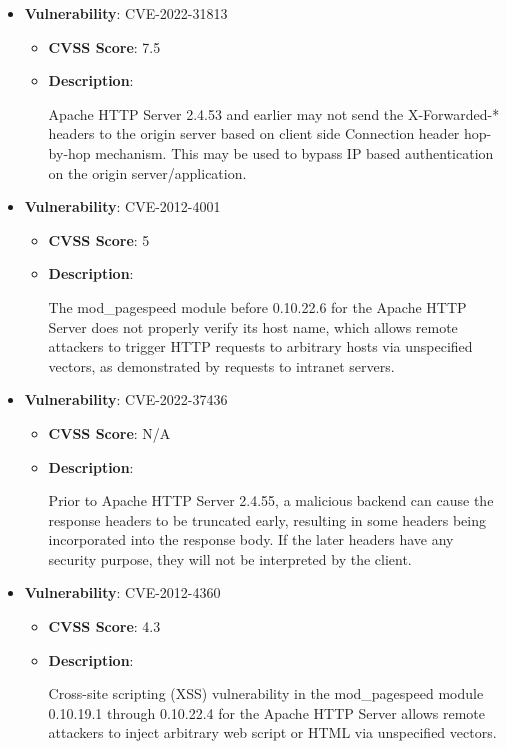 \documentclass{article}
\begin{document}
\begin{itemize}
        \item \textbf{Vulnerability}: CVE-2022-31813
        \begin{itemize}
            \item \textbf{CVSS Score}:  7.5 
            \item \textbf{Description}:
            \parbox[t]{0.9\linewidth}{
                \ttfamily Apache HTTP Server 2.4.53 and earlier may not send the X-Forwarded-* headers to the origin server based on client side Connection header hop-by-hop mechanism. This may be used to bypass IP based authentication on the origin server/application.
            }
        \end{itemize}
    
        \item \textbf{Vulnerability}: CVE-2012-4001
        \begin{itemize}
            \item \textbf{CVSS Score}:  5 
            \item \textbf{Description}:
            \parbox[t]{0.9\linewidth}{
                \ttfamily The mod\_pagespeed module before 0.10.22.6 for the Apache HTTP Server does not properly verify its host name, which allows remote attackers to trigger HTTP requests to arbitrary hosts via unspecified vectors, as demonstrated by requests to intranet servers.
            }
        \end{itemize}
    
        \item \textbf{Vulnerability}: CVE-2022-37436
        \begin{itemize}
            \item \textbf{CVSS Score}:  N/A 
            \item \textbf{Description}:
            \parbox[t]{0.9\linewidth}{
                \ttfamily Prior to Apache HTTP Server 2.4.55, a malicious backend can cause the response headers to be truncated early, resulting in some headers being incorporated into the response body. If the later headers have any security purpose, they will not be interpreted by the client.
            }
        \end{itemize}
    
        \item \textbf{Vulnerability}: CVE-2012-4360
        \begin{itemize}
            \item \textbf{CVSS Score}:  4.3 
            \item \textbf{Description}:
            \parbox[t]{0.9\linewidth}{
                \ttfamily Cross-site scripting (XSS) vulnerability in the mod\_pagespeed module 0.10.19.1 through 0.10.22.4 for the Apache HTTP Server allows remote attackers to inject arbitrary web script or HTML via unspecified vectors.
            }
        \end{itemize}
    

\end{itemize}
\end{document}

